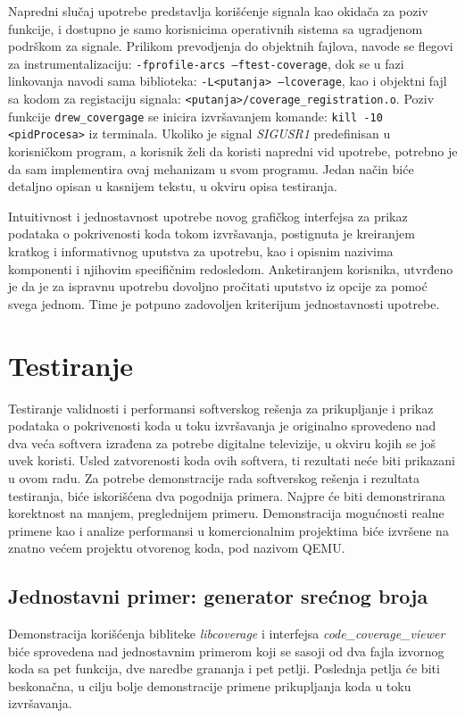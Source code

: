 \documentclass[12pt,oneside]{memoir}
\newcommand{\kod}[1]{\texttt{#1}}
\newcommand{\strano}[1]{\textit{#1}}
\begin{document}
Napredni slučaj upotrebe predstavlja korišćenje signala kao okidača za poziv funkcije, i dostupno je samo korisnicima operativnih sistema sa ugradjenom podrškom za signale. Prilikom prevodjenja do objektnih fajlova, navode se flegovi za instrumentalizaciju: \kod{-fprofile-arcs –ftest-coverage}, dok se u fazi linkovanja navodi sama biblioteka: \kod{-L<putanja> –lcoverage}, kao i objektni fajl sa kodom za registaciju signala: \kod{<putanja>/coverage\_registration.o}. Poziv funkcije \kod{drew\_covergage} se inicira izvršavanjem komande: \kod{kill -10 <pidProcesa>} iz terminala. Ukoliko je signal \strano{SIGUSR1} predefinisan u korisničkom program, a korisnik želi da koristi napredni vid upotrebe, potrebno je da sam implementira ovaj mehanizam u svom programu. Jedan način biće detaljno opisan u kasnijem tekstu, u okviru opisa testiranja. 

Intuitivnost i jednostavnost upotrebe novog grafičkog interfejsa za prikaz podataka o pokrivenosti koda tokom izvršavanja, postignuta je kreiranjem kratkog i informativnog uputstva za upotrebu, kao i opisnim nazivima komponenti i njihovim specifičnim redosledom. Anketiranjem korisnika, utvrđeno je da je za ispravnu upotrebu dovoljno pročitati uputstvo iz opcije za pomoć svega jednom. Time je potpuno zadovoljen kriterijum jednostavnosti upotrebe. 

\section{Testiranje}

Testiranje validnosti i performansi softverskog rešenja za prikupljanje i prikaz podataka o pokrivenosti koda u toku izvršavanja je originalno sprovedeno nad dva veća softvera izrađena za potrebe digitalne televizije, u okviru kojih se još uvek koristi. Usled zatvorenosti koda ovih softvera, ti rezultati neće biti prikazani u ovom radu. Za potrebe demonstracije rada softverskog rešenja i rezultata testiranja, biće iskorišćena dva pogodnija primera. Najpre će biti demonstrirana korektnost na manjem, preglednijem primeru. Demonstracija mogućnosti realne primene kao i analize performansi u komercionalnim projektima biće izvršene na znatno većem projektu otvorenog koda, pod nazivom QEMU. 

\subsection{Jednostavni primer: generator srećnog broja}

Demonstracija korišćenja bibliteke \strano{libcoverage} i interfejsa \strano{code\_coverage\_viewer} biće sprovedena nad jednostavnim primerom koji se sasoji od dva fajla izvornog koda sa pet funkcija, dve naredbe grananja i pet petlji. Poslednja petlja će biti beskonačna, u cilju bolje demonstracije primene prikupljanja koda u toku izvršavanja.
\end{document}
